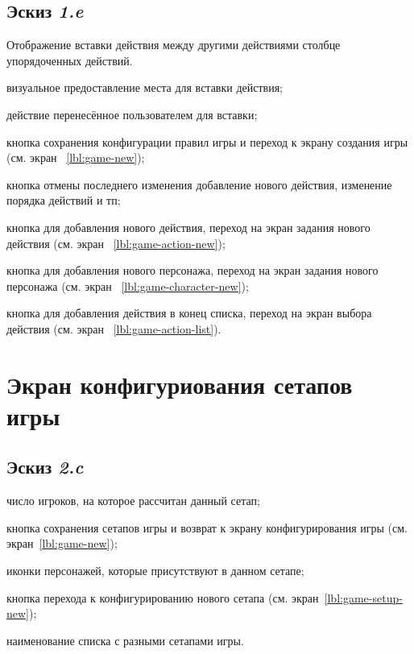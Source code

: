 \subsection{Эскиз \emph{1.e}}

Отображение вставки действия между другими действиями столбце упорядоченных действий.

\begin{enumerate*}
    \item визуальное предоставление места для вставки действия;
    \item действие перенесённое пользователем для вставки;
    \item кнопка сохранения конфигурации правил игры и переход к экрану создания игры (см. экран ~\ref{lbl:game-new});
    \item кнопка отмены последнего изменения добавление нового действия, изменение порядка действий и тп;
    \item кнопка для добавления нового действия, переход на экран задания нового действия (см. экран ~\ref{lbl:game-action-new});
    \item кнопка для добавления нового персонажа, переход на экран задания нового персонажа (см. экран ~\ref{lbl:game-character-new});
    \item кнопка для добавления действия в конец списка, переход на экран выбора действия (см. экран ~\ref{lbl:game-action-list}).
\end{enumerate*}

\section{Экран конфигуриования сетапов игры}\label{lbl:game-setups-new}

\subsection{Эскиз \emph{2.c}}
\begin{enumerate*}
    \item число игроков, на которое рассчитан данный сетап;
    \item кнопка сохранения сетапов игры и возврат к экрану конфигурирования игры (см. экран~\ref{lbl:game-new});
    \item иконки персонажей, которые присутствуют в данном сетапе;
    \item кнопка перехода к конфигурированию нового сетапа (см. экран~\ref{lbl:game-setup-new});
    \item наименование списка с разными сетапами игры.
\end{enumerate*}

